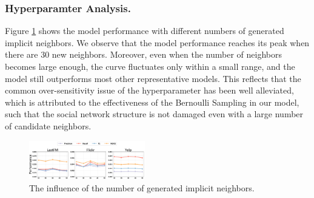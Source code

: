 \documentclass[letterpaper]{article} %
\begin{document}
\subsubsection{Hyperparamter Analysis.}
Figure \ref{fig_hyper} shows the model performance with different numbers of generated implicit neighbors. We observe that the model performance reaches its peak when there are 30 new neighbors. Moreover, even when the number of neighbors becomes large enough, the curve fluctuates only within a small range, and the model still outperforms most other representative models. This reflects that the common over-sensitivity issue of the hyperparameter has been well alleviated, which is attributed to the effectiveness of the Bernoulli Sampling in our model, such that the social network structure is not damaged even with a large number of candidate neighbors.
\begin{figure}[ht!]
  \centering
  \includegraphics[width=0.45\textwidth]{hyper.pdf} %
  \caption{The influence of the number of generated implicit neighbors.}
  \label{fig_hyper}
\end{figure}
\end{document}
